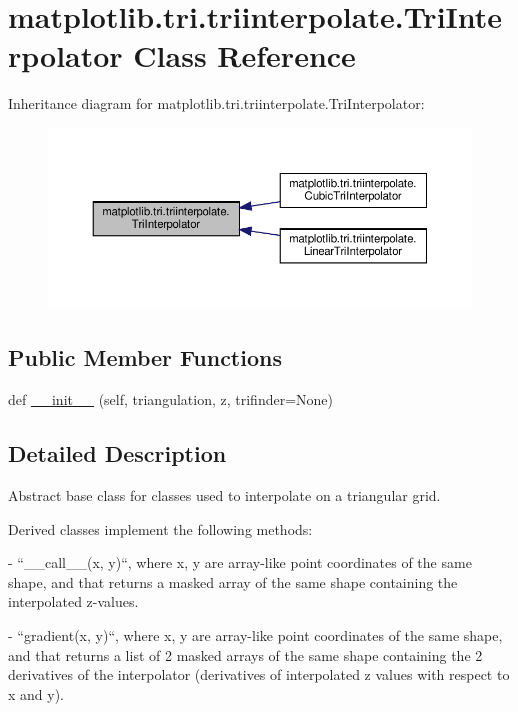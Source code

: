 \hypertarget{classmatplotlib_1_1tri_1_1triinterpolate_1_1TriInterpolator}{}\section{matplotlib.\+tri.\+triinterpolate.\+Tri\+Interpolator Class Reference}
\label{classmatplotlib_1_1tri_1_1triinterpolate_1_1TriInterpolator}


Inheritance diagram for matplotlib.\+tri.\+triinterpolate.\+Tri\+Interpolator\+:
\nopagebreak
\begin{figure}[H]
\begin{center}
\leavevmode
\includegraphics[width=350pt]{classmatplotlib_1_1tri_1_1triinterpolate_1_1TriInterpolator__inherit__graph}
\end{center}
\end{figure}
\subsection*{Public Member Functions}
\begin{DoxyCompactItemize}
\item 
def \hyperlink{classmatplotlib_1_1tri_1_1triinterpolate_1_1TriInterpolator_a1897efb1464e95c3b19a316c742cde5e}{\+\_\+\+\_\+init\+\_\+\+\_\+} (self, triangulation, z, trifinder=None)
\end{DoxyCompactItemize}


\subsection{Detailed Description}
\begin{DoxyVerb}Abstract base class for classes used to interpolate on a triangular grid.

Derived classes implement the following methods:

- ``__call__(x, y)``,
  where x, y are array-like point coordinates of the same shape, and
  that returns a masked array of the same shape containing the
  interpolated z-values.

- ``gradient(x, y)``,
  where x, y are array-like point coordinates of the same
  shape, and that returns a list of 2 masked arrays of the same shape
  containing the 2 derivatives of the interpolator (derivatives of
  interpolated z values with respect to x and y).
\end{DoxyVerb}
 

